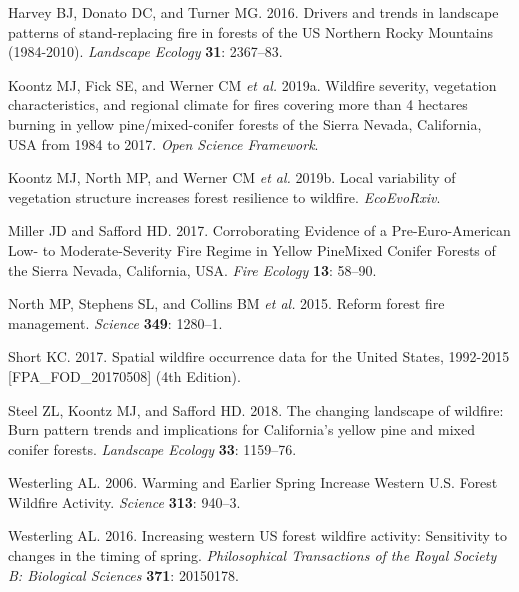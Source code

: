 \documentclass[]{article}
\begin{document}
\hypertarget{ref-harvey2016b}{}
Harvey BJ, Donato DC, and Turner MG. 2016. Drivers and trends in
landscape patterns of stand-replacing fire in forests of the US Northern
Rocky Mountains (1984-2010). \emph{Landscape Ecology} \textbf{31}:
2367--83.

\hypertarget{ref-koontz2019}{}
Koontz MJ, Fick SE, and Werner CM \emph{et al.} 2019a. Wildfire
severity, vegetation characteristics, and regional climate for fires
covering more than 4 hectares burning in yellow pine/mixed-conifer
forests of the Sierra Nevada, California, USA from 1984 to 2017.
\emph{Open Science Framework}.

\hypertarget{ref-koontz2019a}{}
Koontz MJ, North MP, and Werner CM \emph{et al.} 2019b. Local
variability of vegetation structure increases forest resilience to
wildfire. \emph{EcoEvoRxiv}.

\hypertarget{ref-miller2017}{}
Miller JD and Safford HD. 2017. Corroborating Evidence of a
Pre-Euro-American Low- to Moderate-Severity Fire Regime in Yellow
PineMixed Conifer Forests of the Sierra Nevada, California, USA.
\emph{Fire Ecology} \textbf{13}: 58--90.

\hypertarget{ref-north2015}{}
North MP, Stephens SL, and Collins BM \emph{et al.} 2015. Reform forest
fire management. \emph{Science} \textbf{349}: 1280--1.

\hypertarget{ref-short2017}{}
Short KC. 2017. Spatial wildfire occurrence data for the United States,
1992-2015 {[}FPA\_FOD\_20170508{]} (4th Edition).

\hypertarget{ref-steel2018}{}
Steel ZL, Koontz MJ, and Safford HD. 2018. The changing landscape of
wildfire: Burn pattern trends and implications for California's yellow
pine and mixed conifer forests. \emph{Landscape Ecology} \textbf{33}:
1159--76.

\hypertarget{ref-westerling2006}{}
Westerling AL. 2006. Warming and Earlier Spring Increase Western U.S.
Forest Wildfire Activity. \emph{Science} \textbf{313}: 940--3.

\hypertarget{ref-westerling2016}{}
Westerling AL. 2016. Increasing western US forest wildfire activity:
Sensitivity to changes in the timing of spring. \emph{Philosophical
Transactions of the Royal Society B: Biological Sciences} \textbf{371}:
20150178.
\end{document}
